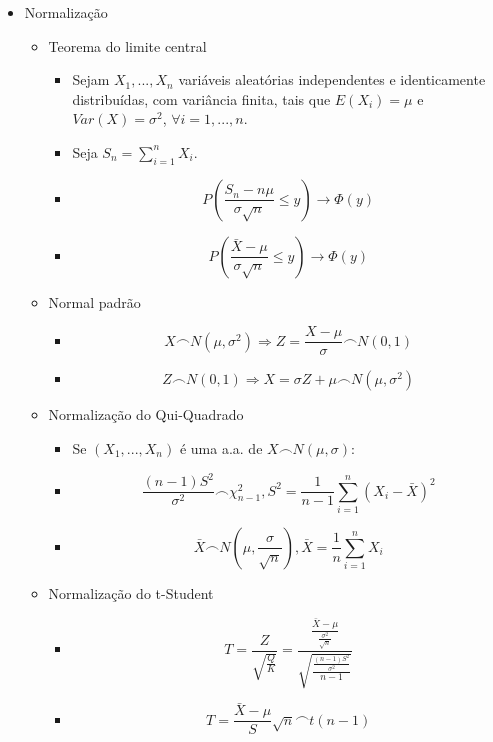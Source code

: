 \documentclass{article}
\begin{document}
\begin{multicols*}{2}
\begin{itemize}
    \item Normalização
    \begin{itemize}
        \item Teorema do limite central
        \begin{itemize}
            \item Sejam $X_1, ..., X_n$ variáveis aleatórias independentes e identicamente distribuídas, com variância finita, tais que $E(X_i)=\mu$ e $Var(X)=\sigma^2$, $\forall i=1,...,n$.
            \item Seja $S_n = \sum_{i=1}^nX_i$.
            \item $$P(\frac{S_n-n\mu}{\sigma\sqrt{n}}\leq y) \longrightarrow \Phi(y)$$ 
            \item $$P(\frac{\bar{X}-\mu}{\sigma\sqrt{n}}\leq y) \longrightarrow \Phi(y)$$ 
        \end{itemize}
        \item Normal padrão
        \begin{itemize}
            \item $$X\frown N(\mu, \sigma^2) \Rightarrow Z=\frac{X-\mu}{\sigma}\frown N(0,1)$$
            \item $$Z\frown N(0, 1) \Rightarrow X=\sigma Z+\mu\frown N(\mu,\sigma^2)$$
        \end{itemize}
        \item Normalização do Qui-Quadrado
        \begin{itemize}
            \item Se $(X_1, ..., X_n)$ é uma a.a. de $X\frown N(\mu, \sigma)$:
            \item $$\frac{(n-1)S^2}{\sigma^2}\frown \chi_{n-1}^2, S^2=\frac{1}{n-1}\sum_{i=1}^n(X_i-\bar{X})^2$$
            \item $$\bar{X}\frown N(\mu, \frac{\sigma}{\sqrt{n}}), \bar{X}=\frac{1}{n}\sum_{i=1}^nX_i$$
        \end{itemize}
        \item Normalização do t-Student
        \begin{itemize}
            \item $$T=\frac{Z}{\sqrt{\frac{Q}{K}}}=\frac{\frac{\bar{X}-\mu}{\frac{\sigma^2}{\sqrt{n}}}}{\sqrt{\frac{\frac{(n-1)S^2}{\sigma^2}}{n-1}}}$$
            \item $$T=\frac{\bar{X}-\mu}{S}\sqrt{n}\frown t(n-1)$$
        \end{itemize}
    \end{itemize}


\end{itemize}
\end{multicols*}
\end{document}

